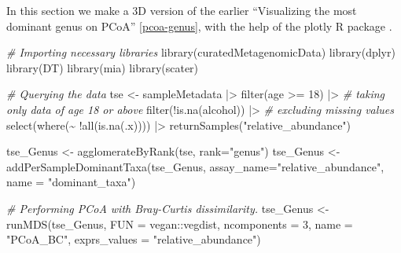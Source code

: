 \documentclass[
]{book}
\newenvironment{Shaded}{\begin{snugshade}}{\end{snugshade}}
\newcommand{\AttributeTok}[1]{\textcolor[rgb]{0.77,0.63,0.00}{#1}}
\newcommand{\CommentTok}[1]{\textcolor[rgb]{0.56,0.35,0.01}{\textit{#1}}}
\newcommand{\DecValTok}[1]{\textcolor[rgb]{0.00,0.00,0.81}{#1}}
\newcommand{\FunctionTok}[1]{\textcolor[rgb]{0.00,0.00,0.00}{#1}}
\newcommand{\NormalTok}[1]{#1}
\newcommand{\OtherTok}[1]{\textcolor[rgb]{0.56,0.35,0.01}{#1}}
\newcommand{\SpecialCharTok}[1]{\textcolor[rgb]{0.00,0.00,0.00}{#1}}
\newcommand{\StringTok}[1]{\textcolor[rgb]{0.31,0.60,0.02}{#1}}
\begin{document}
\begin{Shaded}
\end{Shaded}

In this section we make a 3D version of the earlier ``Visualizing the most dominant genus on PCoA'' \ref{pcoa-genus}, with the help of the plotly R package \citep{Sievert2020}.

\begin{Shaded}
\begin{Highlighting}[]
\CommentTok{\# Importing necessary libraries}
\FunctionTok{library}\NormalTok{(curatedMetagenomicData)}
\FunctionTok{library}\NormalTok{(dplyr)}
\FunctionTok{library}\NormalTok{(DT)}
\FunctionTok{library}\NormalTok{(mia)}
\FunctionTok{library}\NormalTok{(scater)}

\CommentTok{\# Querying the data}
\NormalTok{tse }\OtherTok{\textless{}{-}}\NormalTok{ sampleMetadata }\SpecialCharTok{|\textgreater{}}
    \FunctionTok{filter}\NormalTok{(age }\SpecialCharTok{\textgreater{}=} \DecValTok{18}\NormalTok{) }\SpecialCharTok{|\textgreater{}} \CommentTok{\# taking only data of age 18 or above}
    \FunctionTok{filter}\NormalTok{(}\SpecialCharTok{!}\FunctionTok{is.na}\NormalTok{(alcohol)) }\SpecialCharTok{|\textgreater{}} \CommentTok{\# excluding missing values}
    \FunctionTok{select}\NormalTok{(}\FunctionTok{where}\NormalTok{(}\SpecialCharTok{\textasciitilde{}} \SpecialCharTok{!}\FunctionTok{all}\NormalTok{(}\FunctionTok{is.na}\NormalTok{(.x)))) }\SpecialCharTok{|\textgreater{}}
    \FunctionTok{returnSamples}\NormalTok{(}\StringTok{"relative\_abundance"}\NormalTok{)}

\NormalTok{tse\_Genus }\OtherTok{\textless{}{-}} \FunctionTok{agglomerateByRank}\NormalTok{(tse, }\AttributeTok{rank=}\StringTok{"genus"}\NormalTok{)}
\NormalTok{tse\_Genus }\OtherTok{\textless{}{-}} \FunctionTok{addPerSampleDominantTaxa}\NormalTok{(tse\_Genus, }\AttributeTok{assay\_name=}\StringTok{"relative\_abundance"}\NormalTok{, }\AttributeTok{name =} \StringTok{"dominant\_taxa"}\NormalTok{)}

\CommentTok{\# Performing PCoA with Bray{-}Curtis dissimilarity.}
\NormalTok{tse\_Genus }\OtherTok{\textless{}{-}} \FunctionTok{runMDS}\NormalTok{(tse\_Genus, }\AttributeTok{FUN =}\NormalTok{ vegan}\SpecialCharTok{::}\NormalTok{vegdist, }\AttributeTok{ncomponents =} \DecValTok{3}\NormalTok{,}
              \AttributeTok{name =} \StringTok{"PCoA\_BC"}\NormalTok{, }\AttributeTok{exprs\_values =} \StringTok{"relative\_abundance"}\NormalTok{)}


\end{Highlighting}
\end{Shaded}
\end{document}

